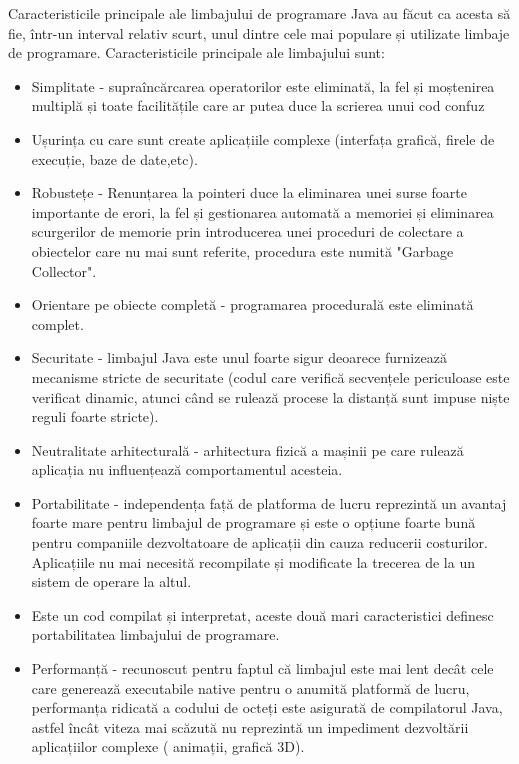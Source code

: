 \documentclass[12pt]{book}
\begin{document}
Caracteristicile principale ale limbajului de programare Java au făcut ca acesta să fie, într-un interval relativ scurt, unul dintre cele mai populare și utilizate limbaje de programare. Caracteristicile principale ale limbajului sunt:
\begin{addmargin}[4em]{1em}
	\begin{itemize}
		\item Simplitate - supraîncărcarea operatorilor este eliminată, la fel și moștenirea multiplă și toate facilitățile care ar putea duce la scrierea unui cod confuz
		\item Ușurința cu care sunt create aplicațiile complexe (interfața grafică, firele de execuție, baze de date,etc).
		\item Robustețe - Renunțarea la pointeri duce la eliminarea unei surse foarte importante de erori, la fel și gestionarea automată a memoriei și eliminarea scurgerilor de memorie prin introducerea unei proceduri de colectare a obiectelor care nu mai sunt referite, procedura este numită "Garbage Collector".
		\item	Orientare pe obiecte completă - programarea procedurală este eliminată complet.
		\item Securitate - limbajul Java este unul foarte sigur deoarece furnizează mecanisme stricte de securitate (codul care verifică secvențele periculoase este verificat dinamic, atunci când se rulează procese la distanță sunt impuse niște reguli foarte stricte).
		\item Neutralitate arhitecturală - arhitectura fizică a mașinii pe care rulează aplicația nu influențează comportamentul acesteia.
		\item Portabilitate - independența față de platforma de lucru reprezintă un avantaj foarte mare pentru limbajul de programare și este o opțiune foarte bună pentru companiile dezvoltatoare de aplicații din cauza reducerii costurilor. Aplicațiile nu mai necesită recompilate și modificate la trecerea de la un sistem de operare la altul.
		\item	Este un cod compilat și interpretat, aceste două mari caracteristici definesc portabilitatea limbajului de programare.
		\item Performanță - recunoscut pentru faptul că limbajul este mai lent decât cele care generează executabile native pentru o anumită platformă de lucru, performanța ridicată a codului de octeți este asigurată de compilatorul Java, astfel încât viteza mai scăzută nu reprezintă un impediment dezvoltării aplicațiilor complexe ( animații, grafică 3D). \cite{cursPracticJava}
\end{itemize}
\end{addmargin}
\end{document}

